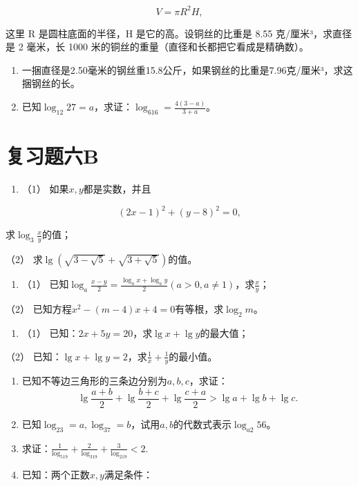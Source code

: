 \[
V = \pi R^{2} H,
\]

这里 R 是圆柱底面的半径，H 是它的高。设铜丝的比重是 8.55
克/厘米³，求直径是 2 毫米，长 1000
米的铜丝的重量（直径和长都把它看成是精确数）。

\begin{enumerate}[start=15]
\item
  一捆直径是2.50毫米的钢丝重15.8公斤，如果钢丝的比重是7.96克/厘米³，求这捆钢丝的长。
\item
  已知\(\log_{12} 27 = a\)，求证：\(\log_616 = \frac{4(3 - a)}{3 + a}\)。
\end{enumerate}

\section{复习题六B}

\begin{enumerate}
\item
  （1） 如果\(x, y\)都是实数，并且
\end{enumerate}

\[
(2 x - 1)^{2} + (y - 8)^{2} = 0,
\]

求\(\log_3\frac{x}{y}\)的值；

（2） 求\(\lg (\sqrt{3 - \sqrt{5}} + \sqrt{3 + \sqrt{5}})\)的值。

\begin{enumerate}[start=2]
\item
  （1）
  已知\(\log_a \frac{x - y}{2} = \frac{\log_a x + \log_a y}{2} (a > 0, a \neq 1)\)，求\(\frac{x}{y}\)；
\end{enumerate}

（2） 已知方程\(x^{2} - (m - 4)x + 4 = 0\)有等根，求\(\log_2 m\)。

\begin{enumerate}[start=3]
\item
  （1） 已知：\(2x + 5y = 20\)，求\(\lg x + \lg y\)的最大值；
\end{enumerate}

（2）
已知：\(\lg x + \lg y = 2\)，求\(\frac{1}{x} + \frac{1}{y}\)的最小值。

\begin{enumerate}[start=4]
\item
  已知不等边三角形的三条边分别为\(a, b, c\)，求证：
\[
\lg \frac{a + b}{2} + \lg \frac{b + c}{2} + \lg \frac{c + a}{2} > \lg a + \lg b + \lg c.
\]
\item
  已知\(\log_23 = a, \log_37 = b\)，试用\(a, b\)的代数式表示\(\log_{a2} 56\)。
\item
  求证：\(\frac{1}{\log_519} + \frac{2}{\log_319} + \frac{3}{\log_219} < 2.\)
\item
  已知：两个正数\(x, y\)满足条件：
\end{enumerate}

